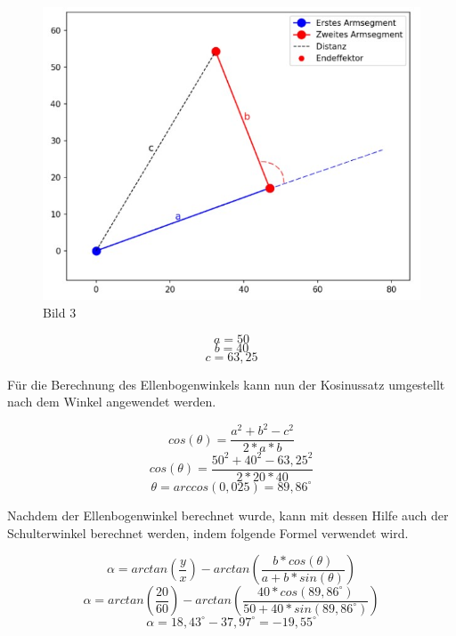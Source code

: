 \documentclass[12pt]{article}
\begin{document}
                    \begin{figure}[h]
                        \centering
                        \includegraphics[width = \linewidth]{Bild 3}
                        \caption{Bild 3}
                    \end{figure}

                    \[
                        a=50
                    \]
                    \[
                        b=40
                    \]
                    \[
                        c=63,25
                    \]

                    Für die Berechnung des Ellenbogenwinkels kann nun der Kosinussatz umgestellt nach dem Winkel
                    angewendet werden.

                    \[
                        cos(\theta)= \frac{a^2+b^2-c^2}{2*a*b}
                    \]
                    \[
                        cos(\theta)= \frac{50^2+40^2-63,25^2}{2*20*40}
                    \]
                    \[
                        \theta= arccos(0,025) = 89,86^\circ
                    \]

                    Nachdem der Ellenbogenwinkel berechnet wurde, kann mit dessen Hilfe auch der Schulterwinkel
                    berechnet werden, indem folgende Formel verwendet wird.

                    \[
                        \alpha = arctan(\frac{y}{x}) - arctan(\frac{b*cos(\theta)}{a+b*sin(\theta)})
                    \]
                    \[
                        \alpha = arctan(\frac{20}{60}) - arctan(\frac{40*cos(89,86^\circ)}{50+40*sin(89,86^\circ)})                    \]
                    \[
                        \alpha = 18,43^\circ - 37,97^\circ = -19,55^\circ
                    \]
\end{document}
